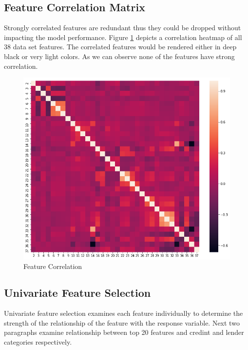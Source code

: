 \hypertarget{feature-correlation-matrix}{%
\subsection{Feature Correlation
Matrix}\label{feature-correlation-matrix}}

Strongly correlated features are redundant thus they could be dropped
without impacting the model performance. Figure \ref{fig:cmatrix}
depicts a correlation heatmap of all 38 data set features. The
correlated features would be rendered either in deep black or very light
colors. As we can observe none of the features have strong correlation.

\begin{Schunk}
\begin{figure}[H]

{\centering \includegraphics[width=0.75\linewidth]{../../artifacts/cmatrix} 

}

\caption[Feature Correlation]{Feature Correlation}\label{fig:cmatrix}
\end{figure}
\end{Schunk}

\hypertarget{univariate-feature-selection}{%
\subsection{Univariate Feature
Selection}\label{univariate-feature-selection}}

Univariate feature selection examines each feature individually to
determine the strength of the relationship of the feature with the
response variable. Next two paragraphs examine relationship between top
20 features and credint and lender categories respectively.

